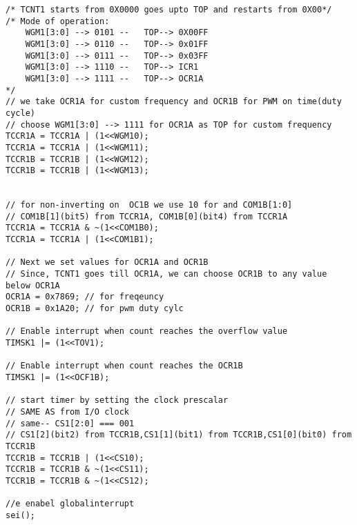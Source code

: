 \begin{verbatim}
/* TCNT1 starts from 0X0000 goes upto TOP and restarts from 0X00*/
/* Mode of operation:
    WGM1[3:0] --> 0101 --	TOP--> 0X00FF
    WGM1[3:0] --> 0110 --	TOP--> 0x01FF
    WGM1[3:0] --> 0111 --	TOP--> 0x03FF
    WGM1[3:0] --> 1110 --	TOP--> ICR1
    WGM1[3:0] --> 1111 --	TOP--> OCR1A
*/	
// we take OCR1A for custom frequency and OCR1B for PWM on time(duty cycle)	
// choose WGM1[3:0] --> 1111 for OCR1A as TOP for custom frequency
TCCR1A = TCCR1A | (1<<WGM10);
TCCR1A = TCCR1A | (1<<WGM11);
TCCR1B = TCCR1B | (1<<WGM12);
TCCR1B = TCCR1B | (1<<WGM13);


// for non-inverting on  OC1B we use 10 for and COM1B[1:0]	
// COM1B[1](bit5) from TCCR1A, COM1B[0](bit4) from TCCR1A
TCCR1A = TCCR1A & ~(1<<COM1B0);
TCCR1A = TCCR1A | (1<<COM1B1);

// Next we set values for OCR1A and OCR1B
// Since, TCNT1 goes till OCR1A, we can choose OCR1B to any value below OCR1A
OCR1A = 0x7869; // for freqeuncy
OCR1B = 0x1A20; // for pwm duty cylc

// Enable interrupt when count reaches the overflow value
TIMSK1 |= (1<<TOV1);

// Enable interrupt when count reaches the OCR1B
TIMSK1 |= (1<<OCF1B);

// start timer by setting the clock prescalar
// SAME AS from I/O clock
// same-- CS1[2:0] === 001
// CS1[2](bit2) from TCCR1B,CS1[1](bit1) from TCCR1B,CS1[0](bit0) from TCCR1B
TCCR1B = TCCR1B | (1<<CS10);
TCCR1B = TCCR1B & ~(1<<CS11);
TCCR1B = TCCR1B & ~(1<<CS12);

//e enabel globalinterrupt
sei();
\end{verbatim}

